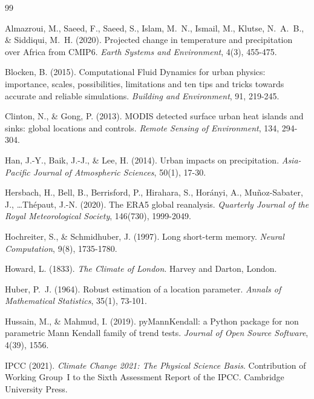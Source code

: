 \documentclass[conference]{IEEEtran}
\begin{document}
\begin{thebibliography}{99}
\small

Almazroui, M., Saeed, F., Saeed, S., Islam, M.~N., Ismail, M.,
Klutse, N.~A.~B., \& Siddiqui, M.~H. (2020).
\newblock Projected change in temperature and precipitation over Africa
from CMIP6.
\newblock \textit{Earth Systems and Environment}, 4(3), 455-475.

Blocken, B. (2015).
\newblock Computational Fluid Dynamics for urban physics: importance,
scales, possibilities, limitations and ten tips and tricks towards
accurate and reliable simulations.
\newblock \textit{Building and Environment}, 91, 219-245.

Clinton, N., \& Gong, P. (2013).
\newblock MODIS detected surface urban heat islands and sinks: global
locations and controls.
\newblock \textit{Remote Sensing of Environment}, 134, 294-304.

Han, J.-Y., Baik, J.-J., \& Lee, H. (2014).
\newblock Urban impacts on precipitation.
\newblock \textit{Asia-Pacific Journal of Atmospheric Sciences},
50(1), 17-30.

Hersbach, H., Bell, B., Berrisford, P., Hirahara, S., Hor{\'a}nyi, A.,
Mu{\~n}oz-Sabater, J., \ldots Th{\'e}paut, J.-N. (2020).
\newblock The ERA5 global reanalysis.
\newblock \textit{Quarterly Journal of the Royal Meteorological Society},
146(730), 1999-2049.

Hochreiter, S., \& Schmidhuber, J. (1997).
\newblock Long short-term memory.
\newblock \textit{Neural Computation}, 9(8), 1735-1780.

Howard, L. (1833).
\newblock \textit{The Climate of London}.
\newblock Harvey and Darton, London.

Huber, P.~J. (1964).
\newblock Robust estimation of a location parameter.
\newblock \textit{Annals of Mathematical Statistics}, 35(1), 73-101.

Hussain, M., \& Mahmud, I. (2019).
\newblock pyMannKendall: a Python package for non parametric Mann Kendall
family of trend tests.
\newblock \textit{Journal of Open Source Software}, 4(39), 1556.

IPCC (2021).
\newblock \textit{Climate Change 2021: The Physical Science Basis}.
\newblock Contribution of Working Group~I to the Sixth Assessment Report
of the IPCC.  Cambridge University Press.


\end{thebibliography}
\end{document}
